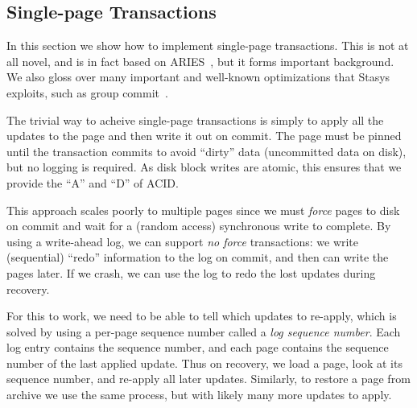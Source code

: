 \documentclass[letterpaper,twocolumn,10pt]{article}
\newcommand{\yad}{Stasys\xspace}
\newcommand{\eat}[1]{}
\begin{document}
\eat{
\yad uses write-ahead-logging to support the
four properties of transactional storage: Atomicity, Consistency,
Isolation and Durability.  Like existing transactional storage sytems,
\yad allows applications to disable or choose different variants of each
property.

However, \yad takes customization of transactional semantics one step
further, allowing applications to add support for transactional
semantics that we have not anticipated.  We do not believe that
we can anticipate every possible variation of write ahead logging.  
However, we
have observed that most changes that we are interested in making
involve a few common underlying primitives.  

As we have
implemented new extensions, we have located portions of the system
that are prone to change, and have extended the API accordingly.  Our
goal is to allow applications to implement their own modules to
replace our implementations of each of the major write ahead logging
components.
}


\subsection{Single-page Transactions}

In this section we show how to implement single-page transactions.
This is not at all novel, and is in fact based on ARIES~\cite{aries}, but it forms
important background.  We also gloss over many important and
well-known optimizations that \yad exploits, such as group
commit~\cite{group-commit}.

The trivial way to acheive single-page transactions is simply to apply
all the updates to the page and then write it out on commit. The page
must be pinned until the transaction commits to avoid ``dirty'' data
(uncommitted data on disk), but no logging is required.  As disk
block writes are atomic, this ensures that we provide the ``A'' and ``D''
of ACID.

This approach scales poorly to multiple pages since we must {\em force} pages to disk
on commit and wait for a (random access) synchronous write to
complete. By using a write-ahead log, we can support {\em no force}
transactions: we write (sequential) ``redo'' information to the log on commit, and
then can write the  pages later. If we crash, we can use the log to
redo the lost updates during recovery.

For this to work, we need to be able to tell which updates to
re-apply, which is solved by using a per-page sequence number called a
{\em log sequence number}. Each log entry contains the sequence
number, and each page contains the sequence number of the last applied
update.  Thus on recovery, we load a page, look at its sequence
number, and re-apply all later updates.  Similarly, to restore a page
from archive we use the same process, but with likely many more
updates to apply.
\end{document}
